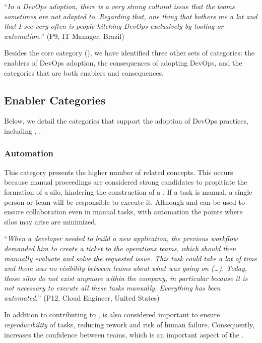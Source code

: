 \begin{mq}``\emph{In a DevOps adoption, there is a very strong cultural issue that the teams
sometimes are not adapted to. Regarding that, one thing that bothers me a lot
and that I see very often is people hitching DevOps exclusively by tooling or
automation.}'' (P9, IT Manager, Brazil)
\end{mq}

Besides the core category (\cc), we have identified
three other sets of categories: the enablers
of DevOps adoption, the consequences of adopting
DevOps, and the categories that are both enablers and consequences.

\subsection{Enabler Categories}

Below, we detail the categories that support the adoption of
DevOps practices, including , .

\subsubsection{Automation} \label{ssec:automation}

This category presents the higher number of related concepts. This
occurs because manual proceedings are considered strong candidates to
propitiate the formation of a silo, hindering the construction
of a \cc. If a task is manual, a single person or
team will be responsible to execute it. Although  and  can
be used to ensure collaboration even in manual tasks, with automation the
points where silos may arise are minimized.

\begin{mq}
``\emph{When a developer needed to build a new application, the previous workflow demanded him
to create a ticket to the operations teams, which should then manually evaluate and solve
the requested issue. This task could take a lot of time and there was no
visibility between teams about what was going on (\ldots). Today, those silos do not exist
anymore within the company, in particular because it is not necessary to execute all these tasks manually.
Everything has been automated.}'' (P12, Cloud Engineer, United States)
\end{mq}

In addition to contributing to ,  is also considered
important to ensure \emph{reproducibility} of tasks, reducing rework and risk of
human failure. Consequently,  increases the confidence
between teams, which is an important aspect of the \cc.

